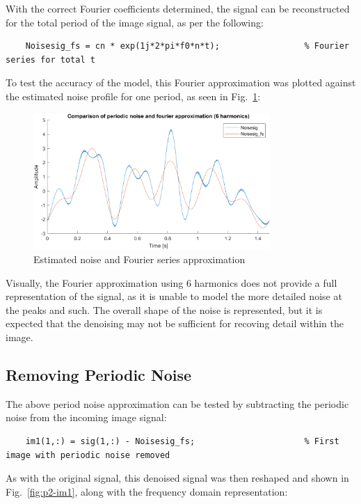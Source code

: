 \documentclass[12pt]{article}
\numberwithin{equation}{section}
\numberwithin{figure}{section}
\numberwithin{table}{section}
\begin{document}
With the correct Fourier coefficients determined, the signal can be
reconstructed for the total period of the image signal, as per the following:
\begin{verbatim}
    Noisesig_fs = cn * exp(1j*2*pi*f0*n*t);                 % Fourier series for total t
\end{verbatim}

To test the accuracy of the model, this Fourier approximation was plotted
against the estimated noise profile for one period, as seen in
Fig.~\ref{fig:p2-noisefscomp}:

\begin{figure}[h]
    \centering
    \includegraphics[width=9cm]{figures/p2-noisefscomp.png}
    \caption{Estimated noise and Fourier series approximation\label{fig:p2-noisefscomp}}
\end{figure}

Visually, the Fourier approximation using 6 harmonics does not provide a full
representation of the signal, as it is unable to model the more detailed noise
at the peaks and such. The overall shape of the noise is represented, but it is
expected that the denoising may not be sufficient for recoving detail within
the image.
\subsection{Removing Periodic Noise}
The above period noise approximation can be tested by subtracting the periodic
noise from the incoming image signal:

\begin{verbatim}
    im1(1,:) = sig(1,:) - Noisesig_fs;                      % First image with periodic noise removed
\end{verbatim}

As with the original signal, this denoised signal was then reshaped and shown
in Fig.~\ref{fig:p2-im1}, along with the frequency domain representation:
\end{document}
